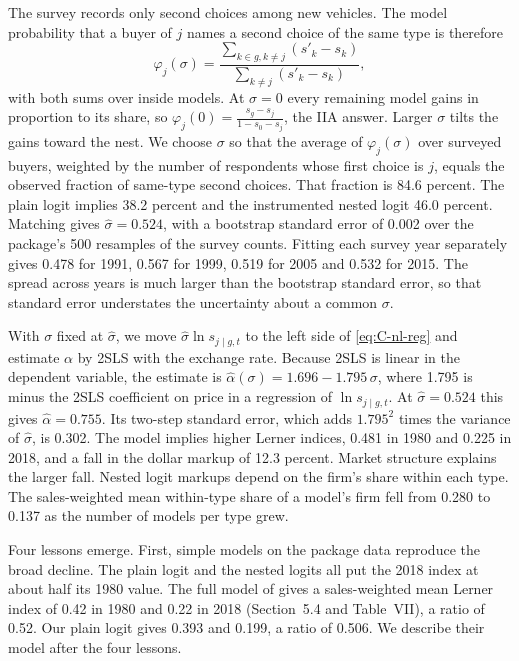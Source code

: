 The survey records only second choices among new vehicles. The model probability that a buyer of $j$ names a second
choice of the same type is therefore
\begin{equation}\label{eq:C-sc-prob}
  \varphi_j(\sigma) = \frac{\sum_{k \in g, k \ne j}(s'_k - s_k)}{\sum_{k \ne j}(s'_k - s_k)} ,
\end{equation}
with both sums over inside models. At $\sigma = 0$ every remaining model gains in proportion to its share, so
$\varphi_j(0) = \frac{s_g - s_j}{1 - s_0 - s_j}$, the IIA answer. Larger $\sigma$ tilts the gains toward the nest. We choose
$\sigma$ so that the average of $\varphi_j(\sigma)$ over surveyed buyers, weighted by the number of respondents whose first
choice is $j$, equals the observed fraction of same-type second choices. That fraction is 84.6 percent. The plain logit
implies 38.2 percent and the instrumented nested logit 46.0 percent. Matching gives $\hat\sigma = 0.524$, with a
bootstrap standard error of 0.002 over the package's 500 resamples of the survey counts. Fitting each survey year
separately gives 0.478 for 1991, 0.567 for 1999, 0.519 for 2005 and 0.532 for 2015. The spread across years is much
larger than the bootstrap standard error, so that standard error understates the uncertainty about a common $\sigma$.

With $\sigma$ fixed at $\hat\sigma$, we move $\hat\sigma\ln s_{j\mid g,t}$ to the left side of \eqref{eq:C-nl-reg} and
estimate $\alpha$ by 2SLS with the exchange rate. Because 2SLS is linear in the dependent variable, the estimate is
$\hat\alpha(\sigma) = 1.696 - 1.795\,\sigma$, where 1.795 is minus the 2SLS coefficient on price in a regression of
$\ln s_{j\mid g,t}$. At $\hat\sigma = 0.524$ this gives $\hat\alpha = 0.755$. Its two-step standard error, which adds
$1.795^2$ times the variance of $\hat\sigma$, is 0.302. The model implies higher Lerner indices, 0.481 in 1980 and
0.225 in 2018, and a fall in the dollar markup of 12.3 percent. Market structure explains the larger fall. Nested logit markups depend on the firm's share within each type. The sales-weighted mean
within-type share of a model's firm fell from 0.280 to 0.137 as the number of models per type grew.

Four lessons emerge. First, simple models on the package data reproduce the broad decline. The plain logit and the
nested logits all put the 2018 index at about half its 1980 value. The full model of \citet{GriecoMurryYurukoglu2024}
gives a sales-weighted mean Lerner index of 0.42 in 1980 and 0.22 in 2018 (Section~5.4 and Table~VII), a ratio of
0.52. Our plain logit gives 0.393 and 0.199, a ratio of 0.506. We describe their model after the four lessons.

